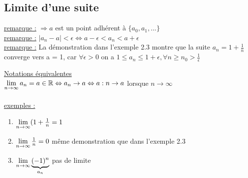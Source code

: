 \documentclass[12pt,a4paper]{article}
\begin{document}
{\subsection{Limite d'une suite}
\begin{center}
\end{center}
\underline{remarque :} $\Rightarrow a$ est un point adhérent à $\{a_0,a_1,...\}$\\
\underline{remarque :} $|a_n-a| < \epsilon \Leftrightarrow a-\epsilon < a_n < a+\epsilon$\\
\underline{remarque :} La démonstration dans l'exemple 2.3 montre que la suite $a_n = 1 + \frac{1}{n}$ converge vers a = 1, car $\forall \epsilon > 0$ on a  $1 \leq a_n \leq 1 + \epsilon, \forall n \geq n_0 > \frac{1}{\epsilon}$

\underline{Notations équivalentes}\\
$\lim\limits_{n \to \infty} a_n = a\in \mathbb{R} \Leftrightarrow a_n \to a \Leftrightarrow a:n \to a$ lorsque $n \to \infty$\\
\\
\underline{exemples :}\\
\begin{enumerate}
\item $\lim\limits_{n \to \infty} (1+\frac{1}{n} = 1$
\item $\lim\limits_{n \to \infty} \frac{1}{n} = 0$ même demonstration que dans l'exemple 2.3
\item $\lim\limits_{n \to \infty} \underbrace{(-1)^n}_{a_n}$ pas de limite
\end{enumerate}

}
\end{document}
